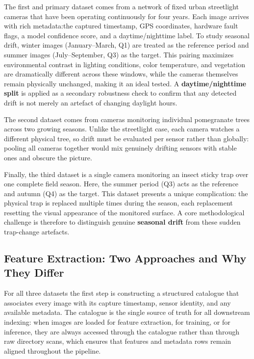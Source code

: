 \documentclass[journal]{IEEEtran} %
\begin{document}
The first and primary dataset comes from a network of fixed urban streetlight cameras that have been operating continuously for four years\cite{eleven}. Each image arrives with rich metadata:the captured timestamp, GPS coordinates, hardware fault flags, a model confidence score, and a daytime/nighttime label. To study seasonal drift, winter images (January–March, Q1) are treated as the reference period and summer images (July–September, Q3) as the target. This pairing maximizes environmental contrast in lighting conditions, color temperature, and vegetation are dramatically different across these windows, while the cameras themselves remain physically unchanged, making it an ideal tested. A \textbf{daytime/nighttime split} is applied as a secondary robustness check to confirm that any detected drift is not merely an artefact of changing daylight hours.

The second dataset comes from cameras monitoring individual pomegranate trees across two growing seasons\cite{fourteen}. Unlike the streetlight case, each camera watches a different physical tree, so drift must be evaluated per sensor rather than globally: pooling all cameras together would mix genuinely drifting sensors with stable ones and obscure the picture.

Finally, the third dataset is a single camera monitoring an insect sticky trap over one complete field season\cite{fifteen}. Here, the summer period (Q3) acts as the reference and autumn (Q4) as the target. This dataset presents a unique complication: the physical trap is replaced multiple times during the season, each replacement resetting the visual appearance of the monitored surface. A core methodological challenge is therefore to distinguish genuine \textbf{seasonal drift} from these sudden trap-change artefacts.

\subsection{Feature Extraction: Two Approaches and Why They Differ}

For all three datasets the first step is constructing a structured catalogue that associates every image with its capture timestamp, sensor identity, and any available metadata. The catalogue is the single source of truth for all downstream indexing: when images are loaded for feature extraction, for training, or for inference, they are always accessed through the catalogue rather than through raw directory scans, which ensures that features and metadata rows remain aligned throughout the pipeline.
\end{document}
